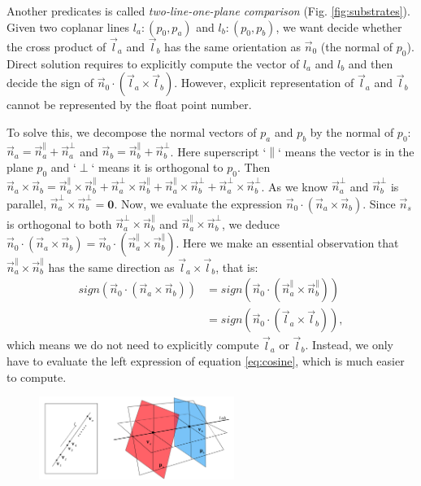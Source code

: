 \documentclass[10pt,journal,compsoc]{IEEEtran}
\begin{document}
Another predicates is called \emph{two-line-one-plane comparison} (Fig. \ref{fig:substrates}). Given two coplanar lines $l_a\colon(p_0, p_a)$ and $l_b\colon(p_0, p_b)$, we want decide whether the cross product of $\vec{l}_a$ and $\vec{l}_b$ has the same orientation as $\vec{n}_0$ (the normal of $p_0$). Direct solution requires to explicitly compute the vector of $l_a$ and $l_b$ and then decide the sign of $\vec{n}_0 \cdot (\vec{l}_a \times \vec{l}_b)$. However, explicit representation of $\vec{l}_a$ and $\vec{l}_b$ cannot be represented by the float point number.

To solve this, we decompose the normal vectors of $p_a$ and $p_b$ by the normal of $p_0$: $\vec{n}_a = \vec{n}^\parallel_a + \vec{n}^\perp_a$ and $\vec{n}_b = \vec{n}^\parallel_b + \vec{n}^\perp_b$. Here superscript `$\parallel$` means the vector is in the plane $p_0$ and `$\perp$` means it is orthogonal to $p_0$. Then $\vec{n}_a \times \vec{n}_b = \vec{n}^\parallel_a \times \vec{n}^\parallel_b + \vec{n}^\perp_a \times \vec{n}^\parallel_b + \vec{n}^\parallel_a \times \vec{n}^\perp_b + \vec{n}^\perp_a \times \vec{n}^\perp_b$. As we know $\vec{n}^\perp_a$ and $\vec{n}^\perp_b$ is parallel, $\vec{n}^\perp_a \times \vec{n}^\perp_b = \textbf{0}$. Now, we evaluate the expression $\vec{n}_0 \cdot (\vec{n}_a \times \vec{n}_b)$. Since $\vec{n}_s$ is orthogonal to both $\vec{n}^\perp_a \times \vec{n}^\parallel_b $ and $\vec{n}^\parallel_a \times \vec{n}^\perp_b $, we deduce $\vec{n}_0 \cdot (\vec{n}_a \times \vec{n}_b) = \vec{n}_0 \cdot (\vec{n}^\parallel_a \times \vec{n}^\parallel_b)$. Here we make an essential observation that $\vec{n}^\parallel_a \times \vec{n}^\parallel_b$ has the same direction as $\vec{l}_a \times \vec{l}_b$, that is:
\begin{equation}
\begin{split}
\label{eq:cosine}
sign(\vec{n}_0 \cdot (\vec{n}_a \times \vec{n}_b)) &= sign(\vec{n}_0 \cdot (\vec{n}^\parallel_a \times \vec{n}^\parallel_b)) \\
&=  sign(\vec{n}_0 \cdot (\vec{l}_a \times \vec{l}_b)),
\end{split}
\end{equation}
which means we do not need to explicitly compute $\vec{l}_a$ or $\vec{l}_b$. Instead, we only have to evaluate the left expression of equation \ref{eq:cosine}, which is much easier to compute.

\begin{figure}
  \centering
  \includegraphics[width=2.5in]{twopointoneline}\\
  \caption{{\color{red}{Sketch: config of two point one line comparison}}}\label{fig:twopointoneline}
\end{figure}
\end{document}
